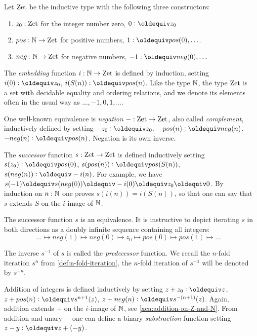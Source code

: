 \begin{definition}\label{def:integers}
Let $\mathrm{Zet}$ be the inductive type with the following three constructors:
\begin{enumerate}
\item $z_0: \mathrm{Zet}$ for the integer number zero, 
$0 \defeq z_0$
\item $pos: \mathbb{N} \to \mathrm{Zet}$ for positive numbers,
$1 \defeq pos(0),\ldots$.
\item $neg: \mathbb{N} \to \mathrm{Zet}$ for negative numbers, 
$-1 \defeq neg(0),\ldots$
\end{enumerate}

The \emph{embedding} function $i:\mathbb{N}\to\mathrm{Zet}$ is defined by induction,
setting $i(0)\defeq z_0$, $i(S(n))\defeq pos(n)$.
Like the type $\mathbb{N}$, the type $\mathrm{Zet}$ is a set with decidable equality
and ordering relations,
and we denote its elements often in the usual way as $\ldots,-1,0,1,\ldots$.

One well-known equivalence is \emph{negation} ${-}:\mathrm{Zet}\to\mathrm{Zet}$, 
also called \emph{complement}, inductively defined by setting 
$-z_0\defeq z_0$, 
$-pos(n)\defeq neg(n)$, 
$-neg(n)\defeq pos(n)$.
Negation is its own inverse.

The \emph{successor} function $s:\mathrm{Zet}\to\mathrm{Zet}$ is defined inductively setting 
$s(z_0)\defeq pos(0)$, 
$s(pos(n))\defeq pos(S(n))$,
$s(neg(n))\defeq -i(n)$. For example, we have
$s(-1)\jdeq s(neg(0))\jdeq -i(0) \jdeq z_0 \jdeq 0$.
By induction on $n:\mathbb{N}$ one proves $s(i(n))=i(S(n))$, 
so that one can say that $s$ extends $S$
on the $i$-image of $\mathbb{N}$. 

The successor function $s$ is an equivalence.
It is instructive to depict iterating $s$ in both directions as 
a doubly infinite sequence containing all integers:
\[
\ldots \mapsto neg(1) \mapsto neg(0) \mapsto z_0 \mapsto pos(0) \mapsto pos(1) \mapsto \ldots
\]

The inverse $s^{-1}$ of $s$ is called the \emph{predecessor} function.
We recall the $n$-fold iteration $s^n$ from \cref{def:n-fold-iteration},
the $n$-fold iteration of $s^{-1}$ will be denoted by $s^{-n}$.

Addition of integers is defined inductively by setting
$z + z_0\defeq z$, 
$z + pos(n)\defeq s^{n+1}(z)$, 
$z + neg(n)\defeq s^{-(n+1)}(z)$.
Again, addition extends $+$ on the $i$-image of $\mathbb{N}$,
see \cref{xca:addition-on-Z-and-N}. 
From addition and unary $-$ one can define a binary
\emph{substraction} function setting $z-y \defeq z+(-y)$.
\end{definition}

